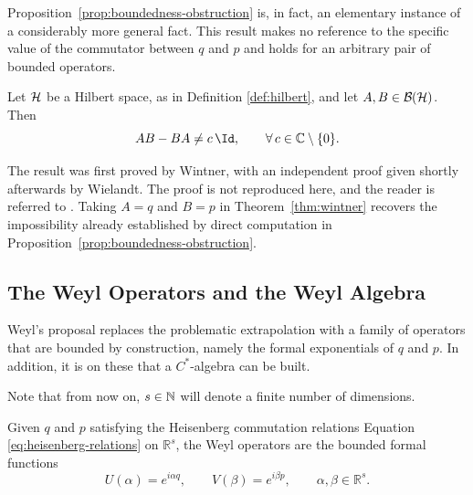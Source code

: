 	\noindent Proposition~\ref{prop:boundedness-obstruction} is, in fact, an elementary instance of a considerably more general fact. This result makes no reference to the specific value of the commutator between $q$ and $p$ and holds for an arbitrary pair of bounded operators. 
	
	\begin{theorem}\label{thm:wintner}
		Let $\H$ be a Hilbert space, as in Definition \ref{def:hilbert}, and let $A,B \in \mathcal{B}(\H)$. Then
		\begin{equation}
			AB - BA \neq c\,\Id, \qquad \forall\, c \in \mathbb{C}\setminus\{0\}.
		\end{equation}
	\end{theorem}
	
	\noindent The result was first proved by Wintner, with an independent proof given shortly afterwards by Wielandt. The proof is not reproduced here, and the reader is referred to \cite[Proposition 11.32]{morettiSpectralTheoryQuantum}. Taking $A=q$ and $B=p$ in Theorem~\ref{thm:wintner} recovers the impossibility already established by direct computation in Proposition~\ref{prop:boundedness-obstruction}.
	
	\subsection*{The Weyl Operators and the Weyl Algebra}
	Weyl's proposal replaces the problematic extrapolation with a family of operators that are bounded by construction, namely the formal exponentials of $q$ and $p$. In addition, it is on these that a $C^*$-algebra can be built.
	
	\begin{remark}
		Note that from now on, $s \in \mathbb{N}$ will denote a finite number of dimensions.
	\end{remark}
	
	\begin{definition}
		\label{def:weyl-operators}
		Given $q$ and $p$ satisfying the Heisenberg commutation relations Equation \eqref{eq:heisenberg-relations} on $\mathbb{R}^s$, the Weyl operators are the bounded formal functions
		\begin{equation}
			U(\alpha) = e^{i\alpha q}, \qquad V(\beta) = e^{i\beta p}, \qquad \alpha,\beta \in \mathbb{R}^s.
			\label{eq:weyl-operators}
		\end{equation}
	\end{definition}
	
